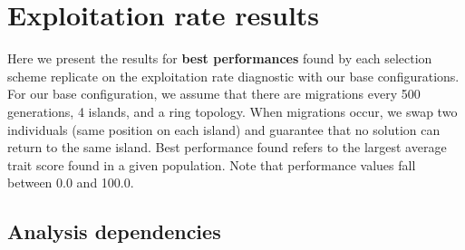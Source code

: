 \documentclass[]{book}
\newenvironment{Shaded}{\begin{snugshade}}{\end{snugshade}}
\newcommand{\CharTok}[1]{\textcolor[rgb]{0.31,0.60,0.02}{#1}}
\newcommand{\DataTypeTok}[1]{\textcolor[rgb]{0.13,0.29,0.53}{#1}}
\newcommand{\KeywordTok}[1]{\textcolor[rgb]{0.13,0.29,0.53}{\textbf{#1}}}
\newcommand{\NormalTok}[1]{#1}
\newcommand{\OperatorTok}[1]{\textcolor[rgb]{0.81,0.36,0.00}{\textbf{#1}}}
\newcommand{\StringTok}[1]{\textcolor[rgb]{0.31,0.60,0.02}{#1}}
\begin{document}
\begin{Shaded}
\end{Shaded}

\hypertarget{exploitation-rate-results}{%
\chapter{Exploitation rate results}\label{exploitation-rate-results}}

Here we present the results for \textbf{best performances} found by each selection scheme replicate on the exploitation rate diagnostic with our base configurations.
For our base configuration, we assume that there are migrations every 500 generations, 4 islands, and a ring topology.
When migrations occur, we swap two individuals (same position on each island) and guarantee that no solution can return to the same island.
Best performance found refers to the largest average trait score found in a given population.
Note that performance values fall between 0.0 and 100.0.

\hypertarget{analysis-dependencies}{%
\section{Analysis dependencies}\label{analysis-dependencies}}
\end{document}
